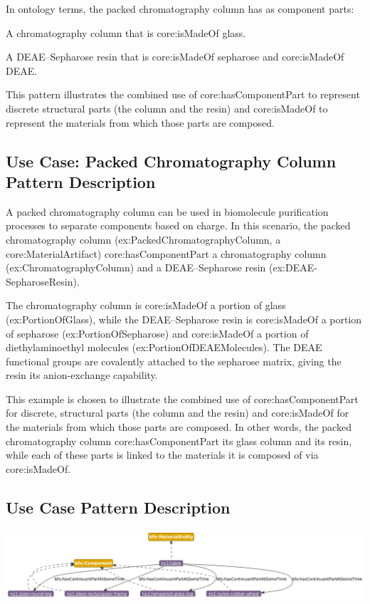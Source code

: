 In ontology terms, the packed chromatography column has as component parts:

A chromatography column that is core:isMadeOf glass.

A DEAE–Sepharose resin that is core:isMadeOf sepharose and core:isMadeOf DEAE.

This pattern illustrates the combined use of core:hasComponentPart to represent discrete structural parts (the column and the resin) and core:isMadeOf to represent the materials from which those parts are composed.

\subsection*{Use Case: Packed Chromatography Column Pattern Description}

A packed chromatography column can be used in biomolecule purification processes to separate components based on charge. In this scenario, the packed chromatography column (ex:PackedChromatographyColumn, a core:MaterialArtifact) core:hasComponentPart a chromatography column (ex:ChromatographyColumn) and a DEAE–Sepharose resin (ex:DEAE-SepharoseResin).

The chromatography column is core:isMadeOf a portion of glass (ex:PortionOfGlass), while the DEAE–Sepharose resin is core:isMadeOf a portion of sepharose (ex:PortionOfSepharose) and core:isMadeOf a portion of diethylaminoethyl molecules (ex:PortionOfDEAEMolecules). The DEAE functional groups are covalently attached to the sepharose matrix, giving the resin its anion-exchange capability.

This example is chosen to illustrate the combined use of core:hasComponentPart for discrete, structural parts (the column and the resin) and core:isMadeOf for the materials from which those parts are composed. In other words, the packed chromatography column core:hasComponentPart its glass column and its resin, while each of these parts is linked to the materials it is composed of via core:isMadeOf.

\subsection*{Use Case Pattern Description}

\includegraphics[scale=0.5]{scenarios/object-artifact-material/image/what-is-made-of.png}

